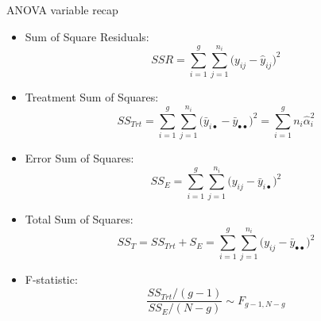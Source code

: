 \begin{frame}[allowframebreaks]{ANOVA variable recap}

  \begin{itemize}
    
    \item Sum of Square Residuals: 
    $$
    SSR = \sum_{i = 1}^g\sum_{j = 1}^{n_i} \big(y_{ij} - \hat{y}_{ij}\big)^2
    $$
    \item Treatment Sum of Squares:
      $$
      SS_{Trt} = \sum_{i = 1}^g\sum_{j = 1}^{n_i} \big(\bar{y}_{i\bullet} - \bar{y}_{\bullet \bullet}\big)^2 = \sum_{i = 1}^g n_i \hat{\alpha}^2_i
      $$
      
    \item Error Sum of Squares:
      $$
      SS_E = \sum_{i = 1}^g \sum_{j = 1}^{n_i} \big(y_{ij} - \bar{y}_{i \bullet})^2
      $$
    
    \item Total Sum of Squares:
    $$
    SS_T = SS_{Trt} + S_E = \sum_{i = 1}^g\sum_{j = 1}^{n_i} \big(y_{ij} - \bar{y}_{\bullet \bullet}\big)^2
    $$
    
    \item F-statistic:
    $$
    \frac{SS_{Trt} / (g - 1)}{SS_E / (N - g)} \sim F_{g-1, N-g}
    $$
  \end{itemize}
\end{frame}

